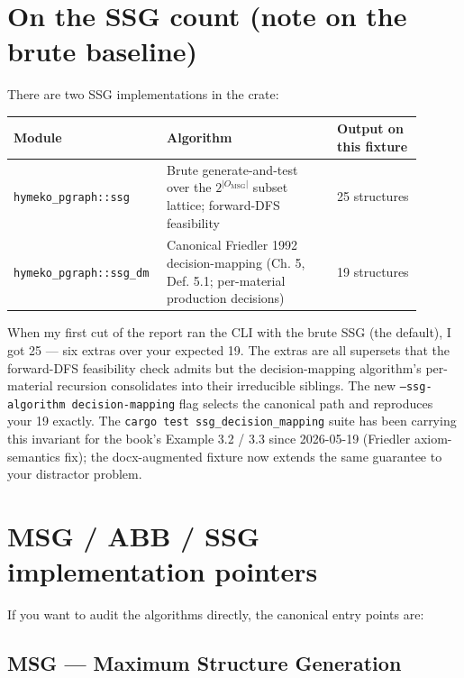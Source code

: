 \documentclass[11pt]{article}
\begin{document}
\section*{On the SSG count (note on the brute baseline)}

There are two SSG implementations in the crate:

\begin{table}[h]
\centering
\small
\begin{tabular}{p{0.30\linewidth}p{0.40\linewidth}p{0.20\linewidth}}
\toprule
Module & Algorithm & Output on this fixture \\
\midrule
\texttt{hymeko\_pgraph::ssg} & Brute generate-and-test over the $2^{|O_\mathrm{MSG}|}$ subset lattice; forward-DFS feasibility & 25 structures \\
\texttt{hymeko\_pgraph::ssg\_dm} & Canonical Friedler 1992 decision-mapping (Ch. 5, Def. 5.1; per-material production decisions) & 19 structures \\
\bottomrule
\end{tabular}
\end{table}

\noindent When my first cut of the report ran the CLI with the brute SSG (the
default), I got 25 --- six extras over your expected 19. The extras are
all supersets that the forward-DFS feasibility check admits but the
decision-mapping algorithm's per-material recursion consolidates into
their irreducible siblings. The new \texttt{--ssg-algorithm decision-mapping}
flag selects the canonical path and reproduces your 19 exactly. The
\texttt{cargo test ssg\_decision\_mapping} suite has been carrying this
invariant for the book's Example 3.2 / 3.3 since 2026-05-19 (Friedler
axiom-semantics fix); the docx-augmented fixture now extends the same
guarantee to your distractor problem.

\section*{MSG / ABB / SSG implementation pointers}

If you want to audit the algorithms directly, the canonical entry
points are:

\subsection*{MSG --- Maximum Structure Generation}
\end{document}
